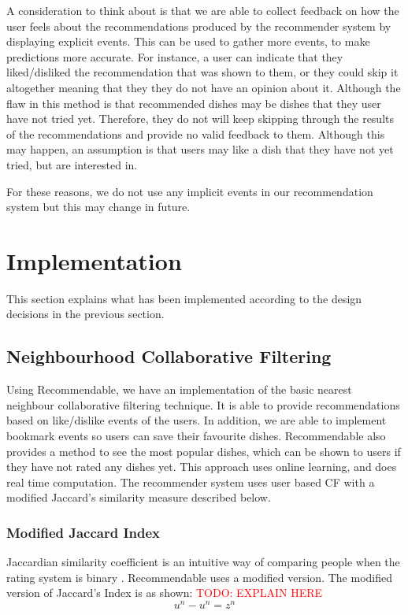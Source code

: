 A consideration to think about is that we are able to collect feedback on how the user feels about the recommendations produced by the recommender system by displaying explicit events. This can be used to gather more events, to make predictions more accurate. For instance, a user can indicate that they liked/disliked the recommendation that was shown to them, or they could skip it altogether meaning that they they do not have an opinion about it. Although the flaw in this method is that recommended dishes may be dishes that they user have not tried yet. Therefore, they do not will keep skipping through the results of the recommendations and provide no valid feedback to them. Although this may happen, an assumption is that users may like a dish that they have not yet tried, but are interested in. 

For these reasons, we do not use any implicit events in our recommendation system but this may change in future. 

\section{Implementation}

This section explains what has been implemented according to the design decisions in the previous section. 

\subsection{Neighbourhood Collaborative Filtering}

Using Recommendable, we have an implementation of the basic nearest neighbour collaborative filtering technique. It is able to provide recommendations based on like/dislike events of the users. In addition, we are able to implement bookmark events so users can save their favourite dishes. Recommendable also provides a method to see the most popular dishes, which can be shown to users if they have not rated any dishes yet. This approach uses online learning, and does real time computation. The recommender system uses user based CF with a modified Jaccard's similarity measure described below.

\subsubsection{Modified Jaccard Index}

Jaccardian similarity coefficient is an intuitive way of comparing people when the rating system is binary \cite{recommendable}. Recommendable uses a modified version. The modified version of Jaccard's Index is as shown:
\textcolor{red}{TODO: EXPLAIN HERE}
\[ u^n - u^n = z^n \]

